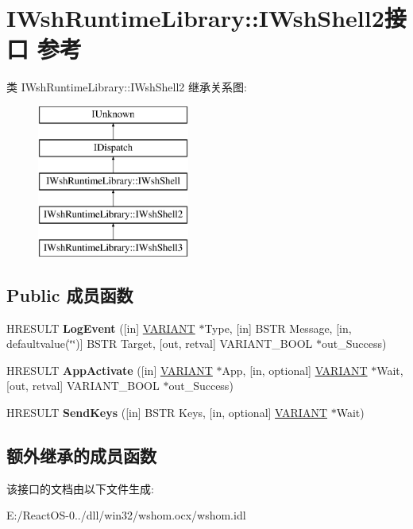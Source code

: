 \hypertarget{interface_i_wsh_runtime_library_1_1_i_wsh_shell2}{}\section{I\+Wsh\+Runtime\+Library\+:\+:I\+Wsh\+Shell2接口 参考}
\label{interface_i_wsh_runtime_library_1_1_i_wsh_shell2}
类 I\+Wsh\+Runtime\+Library\+:\+:I\+Wsh\+Shell2 继承关系图\+:\begin{figure}[H]
\begin{center}
\leavevmode
\includegraphics[height=5.000000cm]{interface_i_wsh_runtime_library_1_1_i_wsh_shell2}
\end{center}
\end{figure}
\subsection*{Public 成员函数}
\begin{DoxyCompactItemize}
\item 
\mbox{\label{interface_i_wsh_runtime_library_1_1_i_wsh_shell2_a09bcd1a888bec5521c48840be8fa9cd6}} 
H\+R\+E\+S\+U\+LT {\bfseries Log\+Event} (\mbox{[}in\mbox{]} \hyperlink{structtag_v_a_r_i_a_n_t}{V\+A\+R\+I\+A\+NT} $\ast$Type, \mbox{[}in\mbox{]} B\+S\+TR Message, \mbox{[}in, defaultvalue(\char`\"{}\char`\"{})\mbox{]} B\+S\+TR Target, \mbox{[}out, retval\mbox{]} V\+A\+R\+I\+A\+N\+T\+\_\+\+B\+O\+OL $\ast$out\+\_\+\+Success)
\item 
\mbox{\label{interface_i_wsh_runtime_library_1_1_i_wsh_shell2_a52b03856d968d8be2ba3f21f4bd13f38}} 
H\+R\+E\+S\+U\+LT {\bfseries App\+Activate} (\mbox{[}in\mbox{]} \hyperlink{structtag_v_a_r_i_a_n_t}{V\+A\+R\+I\+A\+NT} $\ast$App, \mbox{[}in, optional\mbox{]} \hyperlink{structtag_v_a_r_i_a_n_t}{V\+A\+R\+I\+A\+NT} $\ast$Wait, \mbox{[}out, retval\mbox{]} V\+A\+R\+I\+A\+N\+T\+\_\+\+B\+O\+OL $\ast$out\+\_\+\+Success)
\item 
\mbox{\label{interface_i_wsh_runtime_library_1_1_i_wsh_shell2_aab61fd19e4633da9e463866f9e9d0f81}} 
H\+R\+E\+S\+U\+LT {\bfseries Send\+Keys} (\mbox{[}in\mbox{]} B\+S\+TR Keys, \mbox{[}in, optional\mbox{]} \hyperlink{structtag_v_a_r_i_a_n_t}{V\+A\+R\+I\+A\+NT} $\ast$Wait)
\end{DoxyCompactItemize}
\subsection*{额外继承的成员函数}


该接口的文档由以下文件生成\+:\begin{DoxyCompactItemize}
\item 
E\+:/\+React\+O\+S-\/0../dll/win32/wshom.\+ocx/wshom.\+idl\end{DoxyCompactItemize}
